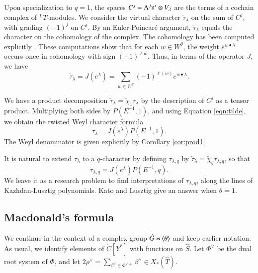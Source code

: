Upon specialization to $q=1$, 
the spaces $C^j=\Lambda^j {\mathfrak n}'\otimes V_\lambda$ are the terms of a cochain complex of ${}^LT$-modules.
We consider the virtual character $\tilde \tau_\lambda$ on  
the sum of $C^j$, with grading $(-1)^j$ on $C^j$.  
By an Euler-Poincar\'e argument, 
$\tilde\tau_\lambda$ equals the character on the cohomology of the complex.  The cohomology has 
been computed explicitly \cite{kostant1961lie}.
These computations show that for each $w\in W^\theta$, the weight $e^{w\bullet \lambda}$ 
occurs once in cohomology with sign $(-1)^{\ell w}$.
Thus, in terms of the operator $J$, we have
\[
\tilde \tau_\lambda = J(e^\lambda) = \sum_{w\in W^\theta} (-1)^{\ell(w)} e^{w\bullet\lambda}.
\]

We have  a product decomposition $\tilde \tau_\lambda = \tilde \chi_{1}\tau_\lambda $ by the description of $C^j$ as
a tensor product.
Multiplying both sides by $P(E^{-1},1)$, and using
Equation \ref{eqn:tilde}, we obtain the twisted Weyl character formula
\begin{equation}
\tau_\lambda = J(e^\lambda) P(E^{-1},1).
\end{equation}
The Weyl denominator is given explicitly by Corollary \ref{cor:prod1}.

It is natural to extend $\tau_\lambda$ to a $q$-character by defining $\tau_{\lambda,q}$ by
$\tilde \tau_\lambda = \tilde \chi_q\tau_{\lambda,q} $, so that
\begin{equation}
\tau_{\lambda,q} = J(e^\lambda) P(E^{-1},q).
\end{equation}
We leave it as a research problem to find interpretations of $\tau_{\lambda,q}$, along the lines of Kazhdan-Lusztig
polynomials.  Kato and Lusztig give an answer when $\theta=1$.


\subsection{Macdonald's formula}\label{sec:macdonald}


We continue in the context of a complex group $\hat G \rtimes \langle{\theta}\rangle$ and keep earlier notation.
As usual, we identify elements of $\ring{C}[Y^*]$ with functions on $\hat S$.  
Let $\Phi^\vee$ be the dual root system of $\Phi$, and let $2\rho^\vee = \sum_{\beta^\vee\in\Phi^{\vee\,+}} \beta^\vee\in X_*(\hat T)$.

